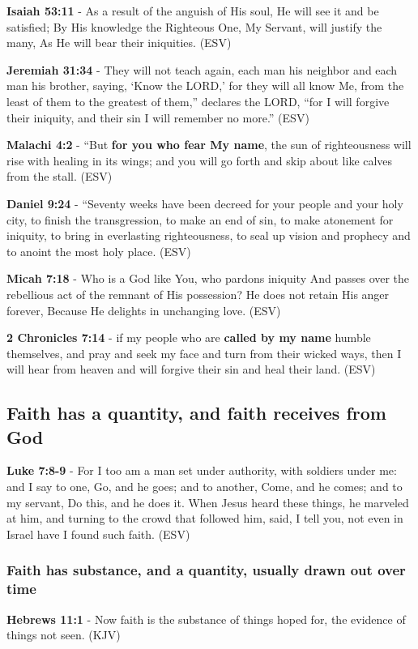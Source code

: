 \documentclass[11pt]{article}
\begin{document}
\textbf{Isaiah 53:11} - As a result of the anguish of His soul, He will see it and be satisfied; By His knowledge the Righteous One, My Servant, will justify the many, As He will bear their iniquities. (ESV)

\textbf{Jeremiah 31:34} - They will not teach again, each man his neighbor and each man his brother, saying, ‘Know the LORD,’ for they will all know Me, from the least of them to the greatest of them,” declares the LORD, “for I will forgive their iniquity, and their sin I will remember no more.” (ESV)

\textbf{Malachi 4:2} - “But \textbf{for you who fear My name}, the sun of righteousness will rise with healing in its wings; and you will go forth and skip about like calves from the stall. (ESV)

\textbf{Daniel 9:24} - “Seventy weeks have been decreed for your people and your holy city, to finish the transgression, to make an end of sin, to make atonement for iniquity, to bring in everlasting righteousness, to seal up vision and prophecy and to anoint the most holy place.  (ESV)

\textbf{Micah 7:18} - Who is a God like You, who pardons iniquity And passes over the rebellious act of the remnant of His possession? He does not retain His anger forever, Because He delights in unchanging love. (ESV)

\textbf{2 Chronicles 7:14} -  if my people who are \textbf{called by my name} humble themselves, and pray and seek my face and turn from their wicked ways, then I will hear from heaven and will forgive their sin and heal their land.  (ESV)

\subsection{Faith has a quantity, and faith receives from God}
\label{sec:org951ad8d}
\textbf{Luke 7:8-9} -  For I too am a man set under authority, with soldiers under me: and I say to one, Go, and he goes; and to another, Come, and he comes; and to my servant, Do this, and he does it.  When Jesus heard these things, he marveled at him, and turning to the crowd that followed him, said, I tell you, not even in Israel have I found such faith.  (ESV)

\subsubsection{Faith has substance, and a quantity, usually drawn out over time}
\label{sec:org3d842f7}
\textbf{Hebrews 11:1} -  Now faith is the substance of things hoped for, the evidence of things not seen.  (KJV)
\end{document}

